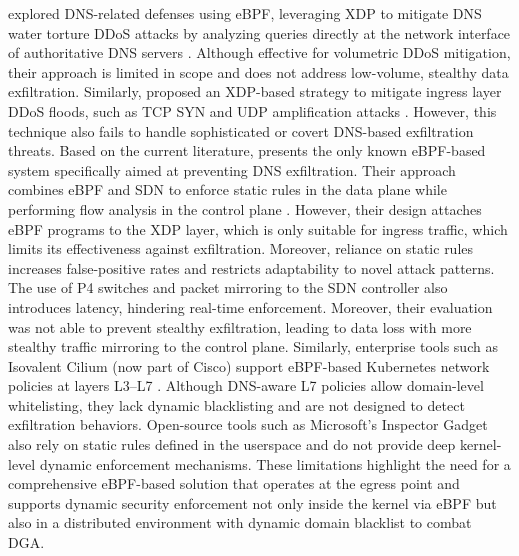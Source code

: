\documentclass [11pt, proquest] {uwthesis}[2020/02/24]
\begin{document}
\citeauthor{9165454} explored DNS-related defenses using eBPF, leveraging XDP to mitigate DNS water torture DDoS attacks by analyzing queries directly at the network interface of authoritative DNS servers \cite{9165454}. Although effective for volumetric DDoS mitigation, their approach is limited in scope and does not address low-volume, stealthy data exfiltration. Similarly, \citeauthor{bertin2017xdp} proposed an XDP-based strategy to mitigate ingress layer DDoS floods, such as TCP SYN and UDP amplification attacks \cite{bertin2017xdp}. However, this technique also fails to handle sophisticated or covert DNS-based exfiltration threats.
Based on the current literature, \citeauthor{steadman2021dnsxp} presents the only known eBPF-based system specifically aimed at preventing DNS exfiltration. Their approach combines eBPF and SDN to enforce static rules in the data plane while performing flow analysis in the control plane \cite{steadman2021dnsxp, 8725640}. However, their design attaches eBPF programs to the XDP layer, which is only suitable for ingress traffic, which limits its effectiveness against exfiltration. Moreover, reliance on static rules increases false-positive rates and restricts adaptability to novel attack patterns. The use of P4 switches and packet mirroring to the SDN controller also introduces latency, hindering real-time enforcement. Moreover, their evaluation was not able to prevent stealthy exfiltration, leading to data loss with more stealthy traffic mirroring to the control plane. Similarly, enterprise tools such as Isovalent Cilium (now part of Cisco) support eBPF-based Kubernetes network policies at layers L3–L7 \cite{zavarella2022methodology}. Although DNS-aware L7 policies allow domain-level whitelisting, they lack dynamic blacklisting and are not designed to detect exfiltration behaviors. Open-source tools such as Microsoft's Inspector Gadget also rely on static rules defined in the userspace and do not provide deep kernel-level dynamic enforcement mechanisms. These limitations highlight the need for a comprehensive eBPF-based solution that operates at the egress point and supports dynamic security enforcement not only inside the kernel via eBPF but also in a distributed environment with dynamic domain blacklist to combat DGA. 
\end{document}
